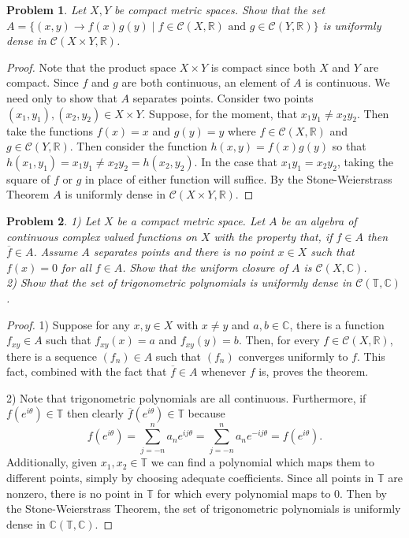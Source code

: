 \documentclass{article}
\newtheorem{problem}{Problem}
\begin{document}
\begin{flushleft}
\begin{problem}
Let $X, Y$ be compact metric spaces. Show that the set $A = \{(x,y) \rightarrow f(x) g(y) \mid f \in \mathcal{C} (X, \mathbb{R}) \text{ and } g \in \mathcal{C} (Y, \mathbb{R}) \}$ is uniformly dense in $\mathcal{C} (X \times Y, \mathbb{R})$.
\end{problem}
\begin{proof}
Note that the product space $X \times Y$ is compact since both $X$ and $Y$ are compact. Since $f$ and $g$ are both continuous, an element of $A$ is continuous. We need only to show that $A$ separates points. Consider two points $(x_1, y_1), (x_2, y_2) \in X \times Y$. Suppose, for the moment, that $x_1y_1 \neq x_2y_2$. Then take the functions $f(x) = x$ and $g (y) = y$ where $f \in \mathcal{C} (X, \mathbb{R})$ and $g \in \mathcal{C} (Y, \mathbb{R})$. Then consider the function $h (x,y) = f(x) g(y)$ so that $h(x_1, y_1) = x_1y_1 \neq x_2y_2 = h(x_2, y_2)$. In the case that $x_1y_1 = x_2y_2$, taking the square of $f$ or $g$ in place of either function will suffice. By the Stone-Weierstrass Theorem $A$ is uniformly dense in $\mathcal{C} (X \times Y, \mathbb{R})$.
\end{proof}

\begin{problem}
1) Let $X$ be a compact metric space. Let $A$ be an algebra of continuous complex valued functions on $X$ with the property that, if $f \in A$ then $\overline{f} \in A$. Assume $A$ separates points and there is no point $x \in X$ such that $f(x) = 0$ for all $f \in A$. Show that the uniform closure of $A$ is $\mathcal{C} (X, \mathbb{C})$.\\
2) Show that the set of trigonometric polynomials is uniformly dense in $\mathcal{C} (\mathbb{T}, \mathbb{C})$.
\end{problem}
\begin{proof}
1) Suppose for any $x, y \in X$ with $x \neq y$ and $a,b \in \mathbb{C}$, there is a function $f_{xy} \in A$ such that $f_{xy}(x) = a$ and $f_{xy}(y) = b$. Then, for every $f \in \mathcal{C} (X, \mathbb{R})$, there is a sequence $(f_n) \in A$ such that $(f_n)$ converges uniformly to $f$. This fact, combined with the fact that $\overline{f} \in A$ whenever $f$ is, proves the theorem.\newline

2) Note that trigonometric polynomials are all continuous. Furthermore, if $f(e^{i \theta}) \in \mathbb{T}$ then clearly $\overline{f}(e^{i \theta}) \in \mathbb{T}$ because
\[
f(e^{i \theta}) = \sum_{j = -n}^{n} a_n e^{ij \theta} = \sum_{j = -n}^{n} a_n e^{-ij \theta} = f(e^{i \theta}).
\]
Additionally, given $x_1, x_2 \in \mathbb{T}$ we can find a polynomial which maps them to different points, simply by choosing adequate coefficients. Since all points in $\mathbb{T}$ are nonzero, there is no point in $\mathbb{T}$ for which every polynomial maps to $0$. Then by the Stone-Weierstrass Theorem, the set of trigonometric polynomials is uniformly dense in $\mathbb{C} (\mathbb{T}, \mathbb{C})$.
\end{proof}

\end{flushleft}
\end{document}
